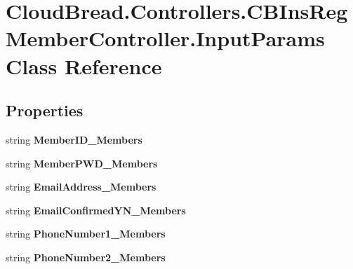 \hypertarget{a00101}{}\section{Cloud\+Bread.\+Controllers.\+C\+B\+Ins\+Reg\+Member\+Controller.\+Input\+Params Class Reference}
\label{a00101}
\subsection*{Properties}
\begin{DoxyCompactItemize}
\item 
string {\bfseries Member\+I\+D\+\_\+\+Members}\hypertarget{a00101_ae3298401d25bde692042f8d933dd045d}{}\label{a00101_ae3298401d25bde692042f8d933dd045d}

\item 
string {\bfseries Member\+P\+W\+D\+\_\+\+Members}\hypertarget{a00101_a88d7236bed4cb796ad47fce33b341117}{}\label{a00101_a88d7236bed4cb796ad47fce33b341117}

\item 
string {\bfseries Email\+Address\+\_\+\+Members}\hypertarget{a00101_a6b75f22014fba445c01f61c91195bfa2}{}\label{a00101_a6b75f22014fba445c01f61c91195bfa2}

\item 
string {\bfseries Email\+Confirmed\+Y\+N\+\_\+\+Members}\hypertarget{a00101_a44be5e1d17fb1977c00d73b35a4cf8d8}{}\label{a00101_a44be5e1d17fb1977c00d73b35a4cf8d8}

\item 
string {\bfseries Phone\+Number1\+\_\+\+Members}\hypertarget{a00101_ad22249843887d7d61ba92565f8d18f32}{}\label{a00101_ad22249843887d7d61ba92565f8d18f32}

\item 
string {\bfseries Phone\+Number2\+\_\+\+Members}\hypertarget{a00101_a7990b7ceae0cc6ca5753679494644de3}{}\label{a00101_a7990b7ceae0cc6ca5753679494644de3}


\end{DoxyCompactItemize}
